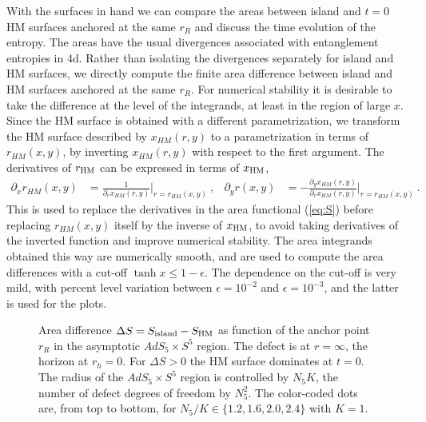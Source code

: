 \documentclass[aps,prd,11pt,notitlepage,longbibliography,nofootinbib,tightenlines,preprintnumbers]{revtex4-1}
\begin{document}
With the surfaces in hand we can compare the areas between island and $t=0$ HM surfaces anchored at the same $r_R$ and discuss the time evolution of the entropy.
The areas have the usual divergences associated with entanglement entropies in 4d.
Rather than isolating the divergences separately for island and HM surfaces, we directly compute the finite area difference between island and HM surfaces anchored at the same $r_R$. 
For numerical stability it is desirable to take the difference at the level of the integrands, at least in the region of large $x$.
Since the HM surface is obtained with a different parametrization, we transform the HM surface described by $x_{HM}(r,y)$ to a parametrization in terms of $r_{HM}(x,y)$, by inverting $x_{HM}(r,y)$ with respect to the first argument. 
The derivatives of $r_{\rm HM}$ can be expressed in terms of $x_{\rm HM}$,
\begin{align}
	\partial_x r_{HM}(x,y)&=\frac{1}{\partial_r x_{HM}(r,y)}\Big\vert_{r=r_{HM}(x,y)}~,
	&
	\partial_y r(x,y)&=-\frac{\partial_y x_{HM}(r,y)}{\partial_r x_{HM}(r,y)}\Big\vert_{r=r_{HM}(x,y)}~.
\end{align}
This is used to replace the derivatives in the area functional (\ref{eq:S}) before replacing $r_{HM}(x,y)$ itself by the inverse of $x_{\rm HM}$, to avoid taking derivatives of the inverted function and improve numerical stability.
The area integrands obtained this way are numerically smooth, and are used to compute the area differences with a cut-off $\tanh x\leq 1-\epsilon$.
The dependence on the cut-off is very mild, with percent level variation between $\epsilon=10^{-2}$ and $\epsilon=10^{-3}$,
and the latter is used for the plots.


\begin{figure}
	
	
	\caption{Area difference $\Delta S=S_{\rm island}-S_{\rm HM}$ as function of the anchor point $r_R$ in the asymptotic $AdS_5\times S^5$ region. The defect is at $r=\infty$, the horizon at $r_h=0$.
		For $\Delta S>0$ the HM surface dominates at $t=0$.
		The radius of the $AdS_5\times S^5$ region is controlled by $N_5K$, the number of defect degrees of freedom by $N_5^2$.
		The color-coded dots are, from top to bottom, for $N_5/K\in\lbrace 1.2,1.6,2.0,2.4\rbrace$ with $K=1$.
		\label{fig:areadiff}}
\end{figure}
\end{document}
